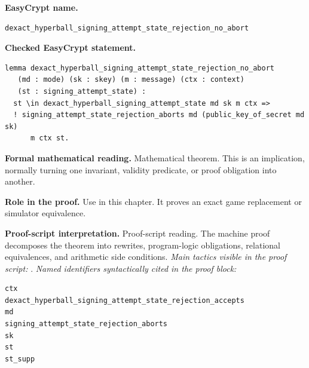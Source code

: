 \begin{formaltheorem}
\noindent\textbf{EasyCrypt name.}
\begin{lstlisting}[language=EasyCrypt,basicstyle=\ttfamily\scriptsize]
dexact_hyperball_signing_attempt_state_rejection_no_abort
\end{lstlisting}
\noindent\textbf{Checked EasyCrypt statement.}
\begin{lstlisting}[language=EasyCrypt,basicstyle=\ttfamily\scriptsize]
lemma dexact_hyperball_signing_attempt_state_rejection_no_abort
   (md : mode) (sk : skey) (m : message) (ctx : context)
   (st : signing_attempt_state) :
  st \in dexact_hyperball_signing_attempt_state md sk m ctx =>
  ! signing_attempt_state_rejection_aborts md (public_key_of_secret md sk)
      m ctx st.
\end{lstlisting}
\noindent\textbf{Formal mathematical reading.}
Mathematical theorem. This is an implication, normally turning one invariant, validity predicate, or proof obligation into another.

\noindent\textbf{Role in the proof.}
Use in this chapter. It proves an exact game replacement or simulator equivalence.

\noindent\textbf{Proof-script interpretation.}
Proof-script reading. The machine proof decomposes the theorem into rewrites, program-logic obligations, relational equivalences, and arithmetic side conditions.
\emph{Main tactics visible in the proof script:} .
\emph{Named identifiers syntactically cited in the proof block:}
\begin{lstlisting}[language=EasyCrypt,basicstyle=\ttfamily\scriptsize]
ctx
dexact_hyperball_signing_attempt_state_rejection_accepts
md
signing_attempt_state_rejection_aborts
sk
st
st_supp
\end{lstlisting}

\end{formaltheorem}

